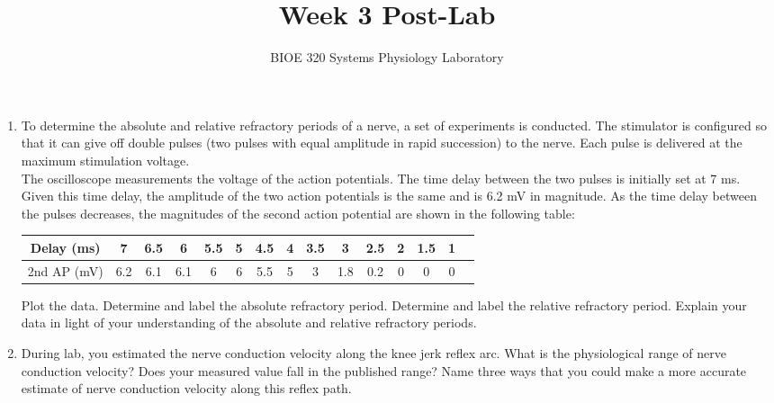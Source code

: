 \documentclass{article}
\title{Week 3 Post-Lab}
\author{BIOE 320 Systems Physiology Laboratory}
\date{}
\begin{document}
\maketitle
\large

\begin{enumerate}
	\item To determine the absolute and relative refractory periods of a nerve, a set of experiments is conducted. The stimulator is configured so that it can give off double pulses (two pulses with equal amplitude in rapid succession) to the nerve. Each pulse is delivered at the maximum stimulation voltage.\\
	
	The oscilloscope measurements the voltage of the action potentials. The time delay between the two pulses is initially set at 7 ms. Given this time delay, the amplitude of the two action potentials is the same and is 6.2 mV in magnitude. As the time delay between the pulses decreases, the magnitudes of the second action potential are shown in the following table:\\
	\normalsize
	\begin{table}[h]
	\centering
	\begin{tabular}[h!]{c|cccccccccccccc}
	\toprule
	Delay (ms) & 7 & 6.5 & 6 & 5.5 & 5 & 4.5 & 4 & 3.5 & 3 & 2.5 & 2 & 1.5 & 1\\
	\midrule
	2nd AP (mV) & 6.2 & 6.1 & 6.1 & 6 & 6 & 5.5 & 5 & 3 & 1.8 & 0.2 & 0 & 0 & 0\\
	\bottomrule
	\end{tabular}
	\end{table}
	\large
	
	Plot the data. Determine and label the absolute refractory period. Determine and label the relative refractory period. Explain your data in light of your understanding of the absolute and relative refractory periods.
	\item During lab, you estimated the nerve conduction velocity along the knee jerk reflex arc. What is the physiological range of nerve conduction velocity? Does your measured value fall in the published range? Name three ways that you could make a more accurate estimate of nerve conduction velocity along this reflex path.
		
\end{enumerate}
\end{document}
